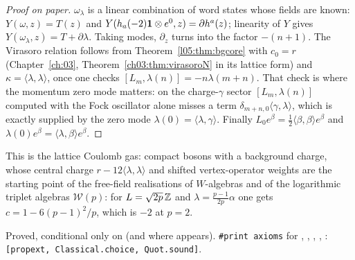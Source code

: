 \begin{proof}[Proof on paper]
$\omega_\lambda$ is a linear combination of word states whose fields are known: $Y(\omega,z)=T(z)$ and
$Y(h_a(-2)\mathbf{1}\otimes e^0,z)=\partial h^a(z)$; linearity of $Y$ gives $Y(\omega_\lambda,z)=T+\partial\lambda$. Taking modes,
$\partial_z$ turns into the factor $-(n+1)$. The Virasoro relation follows from Theorem~\ref{l05:thm:bgcore} with $c_0=r$
(Chapter~\ref{ch:03}, Theorem~\ref{ch03:thm:virasoroN} in its lattice form) and $\kappa=\langle\lambda,\lambda\rangle$, once one
checks $[L_m,\lambda(n)]=-n\lambda(m+n)$. That check is where the momentum zero mode matters: on the charge-$\gamma$ sector
$[L_m,\lambda(n)]$ computed with the Fock oscillator alone misses a term $\delta_{m+n,0}\langle\gamma,\lambda\rangle$, which is
exactly supplied by the zero mode $\lambda(0)=\langle\lambda,\gamma\rangle$. Finally $L_0e^\beta=\frac12\langle\beta,\beta\rangle e^\beta$ and
$\lambda(0)e^\beta=\langle\lambda,\beta\rangle e^\beta$.
\end{proof}

\begin{physics}
This is the lattice Coulomb gas: compact bosons with a background charge, whose central charge
$r-12\langle\lambda,\lambda\rangle$ and shifted vertex-operator weights are the starting point of the free-field realisations of
$W$-algebras and of the logarithmic triplet algebras $\mathcal W(p)$: for $L=\sqrt{2p}\,{\mathbb{Z}}$ and
$\lambda=\frac{p-1}{2p}\alpha$ one gets $c=1-6(p-1)^2/p$, which is $-2$ at $p=2$.
\end{physics}

\begin{status}
Proved, conditional only on  (and  where  appears).
\texttt{\#print axioms} for , , ,
, : \texttt{[propext, Classical.choice, Quot.sound]}.
\end{status}

